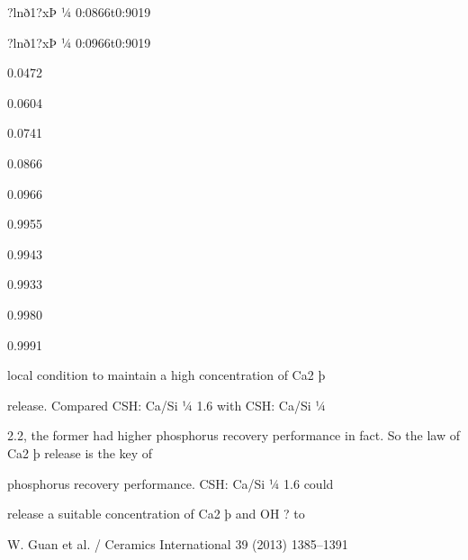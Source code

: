 \documentclass[a4paper,portrait,12pt]{article}
\begin{document}
\begin{flushleft}
?lnð1?xÞ ¼ 0:0866t0:9019
\end{flushleft}


\begin{flushleft}
?lnð1?xÞ ¼ 0:0966t0:9019
\end{flushleft}





0.0472


0.0604


0.0741


0.0866


0.0966





0.9955


0.9943


0.9933


0.9980


0.9991





\begin{flushleft}
local condition to maintain a high concentration of Ca2 þ
\end{flushleft}


\begin{flushleft}
release. Compared CSH: Ca/Si ¼ 1.6 with CSH: Ca/Si ¼
\end{flushleft}


\begin{flushleft}
2.2, the former had higher phosphorus recovery performance in fact. So the law of Ca2 þ release is the key of
\end{flushleft}


\begin{flushleft}
phosphorus recovery performance. CSH: Ca/Si ¼ 1.6 could
\end{flushleft}


\begin{flushleft}
release a suitable concentration of Ca2 þ and OH ? to
\end{flushleft}





\begin{flushleft}
\newpage
W. Guan et al. / Ceramics International 39 (2013) 1385--1391
\end{flushleft}
\end{document}
